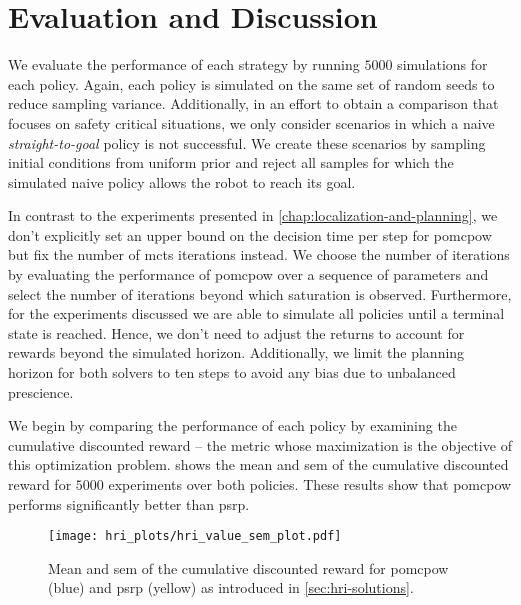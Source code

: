 \section{Evaluation and Discussion}\label{sec:hri-evaluation}

We evaluate the performance of each strategy by running $5000$ simulations for
each policy. Again, each policy is simulated on the same set of random seeds to
reduce sampling variance. Additionally, in an effort to obtain a comparison
that focuses on safety critical situations, we only consider scenarios in which
a naive \emph{straight-to-goal} policy is not successful. We create these
scenarios by sampling initial conditions from uniform prior and reject all
samples for which the simulated naive policy allows the robot to reach its goal.

In contrast to the experiments presented in
\cref{chap:localization-and-planning}, we don't explicitly set an upper bound
on the decision time per step for \ac{pomcpow} but fix the number of
\ac{mcts} iterations instead. We choose the number of iterations by evaluating the
performance of \ac{pomcpow} over a sequence of parameters and select the number
of iterations beyond which saturation is observed. Furthermore, for the
experiments discussed we are able to simulate all policies until a terminal
state is reached. Hence, we don't need to adjust the returns to account for
rewards beyond the simulated horizon. Additionally, we limit the planning horizon
for both solvers to ten steps to avoid any bias due to unbalanced prescience.

We begin by comparing the performance of each policy by examining the
cumulative discounted reward -- the metric whose maximization is the objective
of this optimization problem.  shows the mean and
\ac{sem} of the cumulative discounted reward for $5000$ experiments over both
policies. These results show that \ac{pomcpow} performs significantly better
than \ac{psrp}.

\begin{figure}[htpb]
  \centering
  \texttt{[image: hri\_plots/hri\_value\_sem\_plot.pdf]}
  \caption{Mean and \acf{sem} of the cumulative discounted reward for
  \ac{pomcpow} (blue) and \ac{psrp} (yellow) as introduced in \cref{sec:hri-solutions}.}
  \label{fig:hri_eval_value_sem}
\end{figure}

